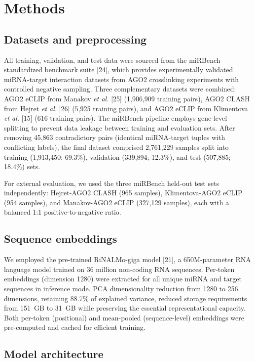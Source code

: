 \documentclass[sn-mathphys-num]{sn-jnl}
\begin{document}
\section{Methods}\label{sec:methods}

\subsection{Datasets and preprocessing}

All training, validation, and test data were sourced from the miRBench standardized benchmark suite [24], which provides experimentally validated miRNA-target interaction datasets from AGO2 crosslinking experiments with controlled negative sampling. Three complementary datasets were combined: AGO2 eCLIP from Manakov \textit{et al.} [25] (1,906,909 training pairs), AGO2 CLASH from Hejret \textit{et al.} [26] (5,925 training pairs), and AGO2 eCLIP from Klimentova \textit{et al.} [15] (616 training pairs). The miRBench pipeline employs gene-level splitting to prevent data leakage between training and evaluation sets. After removing 45,863 contradictory pairs (identical miRNA-target tuples with conflicting labels), the final dataset comprised 2,761,229 samples split into training (1,913,450; 69.3\%), validation (339,894; 12.3\%), and test (507,885; 18.4\%) sets.

For external evaluation, we used the three miRBench held-out test sets independently: Hejret-AGO2 CLASH (965 samples), Klimentova-AGO2 eCLIP (954 samples), and Manakov-AGO2 eCLIP (327,129 samples), each with a balanced 1:1 positive-to-negative ratio.

\subsection{Sequence embeddings}

We employed the pre-trained RiNALMo-giga model [21], a 650M-parameter RNA language model trained on 36 million non-coding RNA sequences. Per-token embeddings (dimension 1280) were extracted for all unique miRNA and target sequences in inference mode. PCA dimensionality reduction from 1280 to 256 dimensions, retaining 88.7\% of explained variance, reduced storage requirements from 151~GB to 31~GB while preserving the essential representational capacity. Both per-token (positional) and mean-pooled (sequence-level) embeddings were pre-computed and cached for efficient training.

\subsection{Model architecture}
\end{document}
